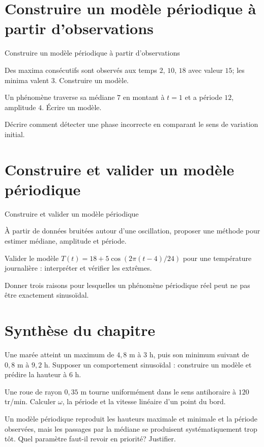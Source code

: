 \section{Construire un modèle périodique à partir d'observations}
\label{workbook:section:17.07}
\begin{exerciseblock}{Construire un modèle périodique à partir d'observations}
\item Des maxima consécutifs sont observés aux temps $2$, $10$, $18$ avec valeur $15$; les minima valent $3$. Construire un modèle.
\item Un phénomène traverse sa médiane $7$ en montant à $t=1$ et a période $12$, amplitude $4$. Écrire un modèle.
\item Décrire comment détecter une phase incorrecte en comparant le sens de variation initial.
\end{exerciseblock}
\section{Construire et valider un modèle périodique}
\label{workbook:section:17.08}
\begin{exerciseblock}{Construire et valider un modèle périodique}
\item À partir de données bruitées autour d'une oscillation, proposer une méthode pour estimer médiane, amplitude et période.
\item Valider le modèle $T(t)=18+5\cos(2\pi(t-4)/24)$ pour une température journalière : interpréter et vérifier les extrêmes.
\item Donner trois raisons pour lesquelles un phénomène périodique réel peut ne pas être exactement sinusoïdal.
\end{exerciseblock}
\section*{Synthèse du chapitre}
\begin{synthesisbox}
\item Une marée atteint un maximum de $4{,}8$ m à $3$ h, puis son minimum suivant de $0{,}8$ m à $9{,}2$ h. Supposer un comportement sinusoïdal : construire un modèle et prédire la hauteur à $6$ h.
\item Une roue de rayon $0{,}35$ m tourne uniformément dans le sens antihoraire à $120$ tr/min. Calculer $\omega$, la période et la vitesse linéaire d'un point du bord.
\item Un modèle périodique reproduit les hauteurs maximale et minimale et la période observées, mais les passages par la médiane se produisent systématiquement trop tôt. Quel paramètre faut-il revoir en priorité? Justifier.
\end{synthesisbox}
